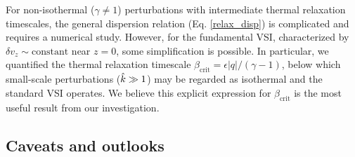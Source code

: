 For non-isothermal ($\gamma\neq1$) perturbations with intermediate
thermal relaxation timescales, the general dispersion relation
(Eq. \ref{relax_disp}) is complicated and requires a numerical
study. However, for the fundamental VSI, characterized by  $\delta
v_z\sim\mathrm{constant}$ near $z=0$, some simplification is
possible. In particular, we quantified the thermal relaxation
timescale $\beta_\mathrm{crit}=\epsilon|q|/(\gamma-1)$, below
which small-scale perturbations ($\hat{k}\gg 1$) may be regarded as isothermal
and the standard VSI operates. We believe this explicit expression for
$\beta_\mathrm{crit}$ is the most useful result from our
investigation.


 














\subsection{Caveats and outlooks} 